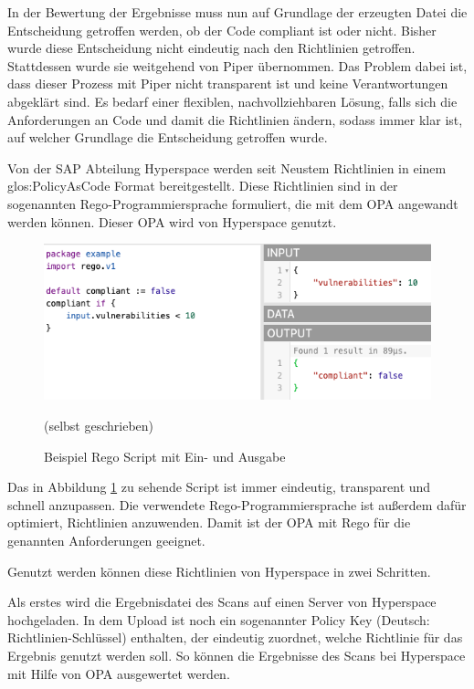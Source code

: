 \documentclass[../main.tex]{subfiles}
\begin{document}
In der Bewertung der Ergebnisse muss nun auf Grundlage der erzeugten Datei die Entscheidung getroffen werden, ob der Code compliant ist oder nicht.
Bisher wurde diese Entscheidung nicht eindeutig nach den Richtlinien getroffen.
Stattdessen wurde sie weitgehend von Piper übernommen.
Das Problem dabei ist, dass dieser Prozess mit Piper nicht transparent ist und keine Verantwortungen abgeklärt sind.
Es bedarf einer flexiblen, nachvollziehbaren Lösung, falls sich die Anforderungen an Code und damit die Richtlinien ändern, sodass immer klar ist, auf welcher Grundlage die Entscheidung getroffen wurde.

Von der SAP Abteilung Hyperspace werden seit Neustem Richtlinien in einem \gls{glos:PolicyAsCode} Format bereitgestellt.
Diese Richtlinien sind in der sogenannten Rego-Programmiersprache formuliert, die mit dem \gls{OPA} angewandt werden können.
Dieser \gls{OPA} wird von Hyperspace genutzt.

\begin{figure}[ht]
    \centering
    \includegraphics[scale=0.65]{bilder/regoexample.png}
    \caption{Beispiel Rego Script mit Ein- und Ausgabe}
    \footnotesize (selbst geschrieben)
    \label{fig:regoexample}
\end{figure}

Das in Abbildung \ref{fig:regoexample} zu sehende Script ist immer eindeutig, transparent und schnell anzupassen.
Die verwendete Rego-Programmiersprache ist außerdem dafür optimiert, Richtlinien anzuwenden.
Damit ist der \gls{OPA} mit Rego für die genannten Anforderungen geeignet.
\cite{Rego}

Genutzt werden können diese Richtlinien von Hyperspace in zwei Schritten.

Als erstes wird die Ergebnisdatei des Scans auf einen Server von Hyperspace hochgeladen.
In dem Upload ist noch ein sogenannter Policy Key (Deutsch: Richtlinien-Schlüssel) enthalten, der eindeutig zuordnet, welche Richtlinie für das Ergebnis genutzt werden soll.
So können die Ergebnisse des Scans bei Hyperspace mit Hilfe von \gls{OPA} ausgewertet werden.
\end{document}
